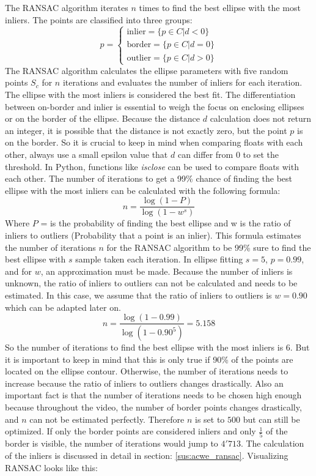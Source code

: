 The RANSAC algorithm iterates $n$ times to find the best ellipse with the most inliers. The points are classified into three groups: 
\begin{equation}
    p =\begin{cases}
    \text{inlier} = \{p \in C | d < 0\}\\
    \text{border} = \{p \in C | d = 0\}\\
    \text{outlier} = \{p \in C | d > 0\}
    \end{cases}
    \label{inliers}
\end{equation}
The RANSAC algorithm calculates the ellipse parameters with five random points $S_c$ for $n$ iterations and evaluates the number of inliers for each iteration. The ellipse with the most inliers is considered the best fit. 
The differentiation between on-border and inlier is essential to weigh the focus on enclosing ellipses or on the border of the ellipse. Because the distance $d$ calculation does not return an integer, it is possible that the distance is not exactly zero, but the point $p$ is on the border. So it is crucial to keep in mind when comparing floats with each other, always use a small epsilon value that $d$ can differ from 0 to set the threshold. 
In Python, functions like \textit{isclose} can be used to compare floats with each other. The number of iterations to get a 99\% chance of finding the best ellipse with the most inliers can be calculated with the following formula: 
\begin{equation}
    n = \frac{\log(1-P)}{\log(1-w^s)}
    \label{iterations}
\end{equation}
Where $P$ = is the probability of finding the best ellipse and w is the ratio of inliers to outliers (Probability that a point is an inlier). This formula estimates the number of iterations $n$ for the RANSAC algorithm to be 99\% sure to find the best ellipse with  $s$ sample taken each iteration. In ellipse fitting $s=5$, $p=0.99$, and for $w$, an approximation must be made. Because the number of inliers is unknown, the ratio of inliers to outliers can not be calculated and needs to be estimated. In this case, we assume that the ratio of inliers to outliers is $w=0.90$ which can be adapted later on. 
\begin{equation}
    n = \frac{\log(1-0.99)}{\log(1-0.90^5)} =  5.158
\end{equation}
So the number of iterations to find the best ellipse with the most inliers is 6. But it is important to keep in mind that this is only true if 90\% of the points are located on the ellipse contour. Otherwise, the number of iterations needs to increase because the ratio of inliers to outliers changes drastically. Also an important fact is that the number of iterations needs to be chosen high enough because throughout the video, the number of border points changes drastically, and $n$ can not be estimated perfectly. Therefore $n$ is set to $500$ but can still be optimized. If only the border points are considered inliers and only $\frac{1}{5}$ of the border is visible, the number of iterations would jump to $4'713$. The calculation of the inliers is discussed in detail in section: \ref{sus:acwe_ransac}. Visualizing RANSAC looks like this:
